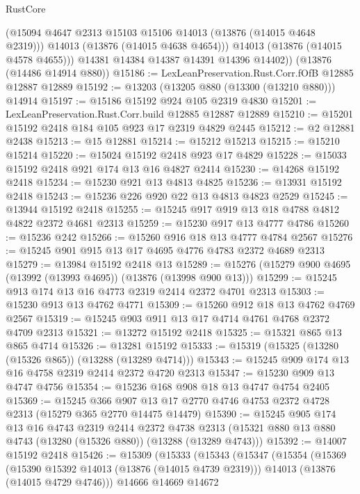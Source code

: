 \begin{lexlean}{RustCore}
\begin{coremodule}
            (@15094 @4647 @2313 @15103 @15106 @14013 (@13876 (@14015 @4648 @2319)))
            @14013
            (@13876 (@14015 @4638 @4654)))
          @14013
          (@13876 (@14015 @4578 @4655)))
        @14381
        @14384
        @14387
        @14391
        @14396
        @14402))
    (@13876 (@14486 @14914 @880))
@15186 := LexLeanPreservation.Rust.Corr.fOfB @12885 @12887 @12889
@15192 := @13203 (@13205 @880 (@13300 (@13210 @880))) @14914
@15197 := @15186 @15192 @924 @105 @2319 @4830
@15201 := LexLeanPreservation.Rust.Corr.build @12885 @12887 @12889
@15210 := @15201 @15192 @2418 @184 @105 @923 @17 @2319 @4829 @2445
@15212 := @2 @12881 @2438
@15213 := @15 @12881
@15214 := @15212 @15213
@15215 := @15210 @15214
@15220 := @15024 @15192 @2418 @923 @17 @4829
@15228 := @15033 @15192 @2418 @921 @174 @13 @16 @4827 @2414
@15230 := @14268 @15192 @2418
@15234 := @15230 @921 @13 @4813 @4825
@15236 := @13931 @15192 @2418
@15243 := @15236 @226 @920 @22 @13 @4813 @4823 @2529
@15245 := @13944 @15192 @2418
@15255 := @15245 @917 @919 @13 @18 @4788 @4812 @4822 @2372 @4681 @2313
@15259 := @15230 @917 @13 @4777 @4786
@15260 := @15236 @242
@15266 := @15260 @916 @18 @13 @4777 @4784 @2567
@15276 := @15245 @901 @915 @13 @17 @4695 @4776 @4783 @2372 @4689 @2313
@15279 := @13984 @15192 @2418 @13
@15289 := @15276 (@15279 @900 @4695 (@13992 (@13993 @4695)) (@13876 (@13998 @900 @13)))
@15299 := @15245 @913 @174 @13 @16 @4773 @2319 @2414 @2372 @4701 @2313
@15303 := @15230 @913 @13 @4762 @4771
@15309 := @15260 @912 @18 @13 @4762 @4769 @2567
@15319 := @15245 @903 @911 @13 @17 @4714 @4761 @4768 @2372 @4709 @2313
@15321 := @13272 @15192 @2418
@15325 := @15321 @865 @13 @865 @4714
@15326 := @13281 @15192
@15333 := @15319 (@15325 (@13280 (@15326 @865)) (@13288 (@13289 @4714)))
@15343 := @15245 @909 @174 @13 @16 @4758 @2319 @2414 @2372 @4720 @2313
@15347 := @15230 @909 @13 @4747 @4756
@15354 := @15236 @168 @908 @18 @13 @4747 @4754 @2405
@15369 := @15245
    @366
    @907
    @13
    @17
    @2770
    @4746
    @4753
    @2372
    @4728
    @2313
    (@15279 @365 @2770 @14475 @14479)
@15390 := @15245
    @905
    @174
    @13
    @16
    @4743
    @2319
    @2414
    @2372
    @4738
    @2313
    (@15321 @880 @13 @880 @4743 (@13280 (@15326 @880)) (@13288 (@13289 @4743)))
@15392 := @14007 @15192 @2418
@15426 := @15309
    (@15333
      (@15343
        (@15347
          (@15354
            (@15369
              (@15390 @15392 @14013 (@13876 (@14015 @4739 @2319)))
              @14013
              (@13876 (@14015 @4729 @4746)))
            @14666
            @14669
            @14672

\end{coremodule}
\end{lexlean}
